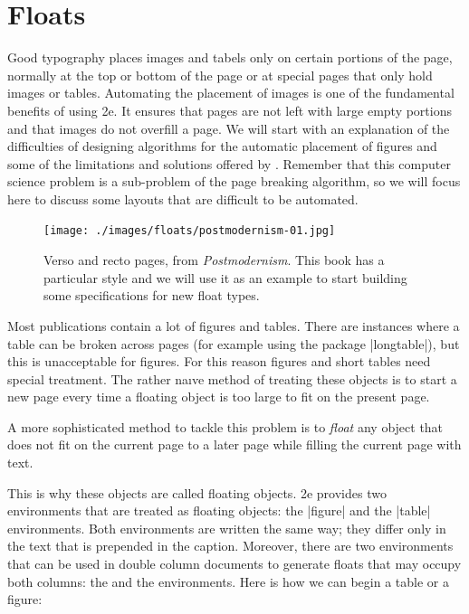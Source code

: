 
\chapter{Floats}

Good typography places images and tabels only on certain portions of the page, normally at the top or bottom of the page or at special pages that only hold images or tables. Automating the placement of images is one of the fundamental benefits of using \latex2e. It ensures that pages are not left with large empty portions and that images do not overfill a page. We will start with an explanation of the difficulties of designing algorithms for the automatic placement of figures and some of the limitations and solutions offered by \latexe. Remember that this computer science problem is a sub-problem of the page breaking algorithm, so we will focus here to discuss some layouts that are difficult to be automated. 

\begin{figure}[htb]
\texttt{[image: ./images/floats/postmodernism-01.jpg]}
\caption{Verso and recto pages, from \textit{Postmodernism}. This book has a particular style and we will use it as an example to start building some specifications for new float types.}
\label{fig:postmodern1}
\end{figure}

Most publications contain a lot of figures and tables. There are instances where
a table can be broken across pages (for example using the package |longtable|), but this is unacceptable for figures. For this reason
figures and short tables need special treatment. The rather naıve method of treating these
objects is to start a new page every time a floating object is too large to fit on the present
page. 

A more sophisticated method to tackle this problem is to \emph{float} any object that
does not fit on the current page to a later page while filling the current page with text.

This is why these objects are called floating objects. \latex2e provides two environments
that are treated as floating objects: the |figure| and the |table| environments. Both environments
are written the same way; they differ only in the text that is prepended in the
caption. Moreover, there are two environments that can be used in double column documents
to generate floats that may occupy both columns: the  and the 
environments. Here is how we can begin a table or a figure:

